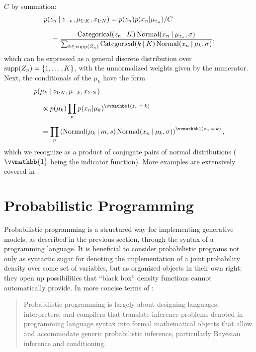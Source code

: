 \(C\) by summation:
\begin{equation}
  \setlength{\jot}{0.8\baselineskip}
  \begin{aligned}
    &p(z_{n} \given z_{-n}, \mu_{1:K}, x_{1:N}) = p(z_{n}) p(x_{n} | \mu_{z_{n}}) / C  \\
    &\quad = \dfrac{\distr{Categorical}(z_{n} \given K) \, \Normal(x_{n} \given \mu_{z_{n}}, \sigma)}{
      \sum_{k \in\, \supp(Z_{n})} \distr{Categorical}(k \given K)\, \Normal(x_{n} \given \mu_{k},
      \sigma)}, \\
  \end{aligned}
\end{equation}
which can be expressed as a general discrete distribution over \(\operatorname{supp}(Z_{n}) = \{1, \ldots, K\}\),
with the unnormalized weights given by the numerator.  Next, the conditionals of the \(\mu_{k}\)
have the form
\begin{equation}
  \setlength{\jot}{0.8\baselineskip}
  \begin{aligned}
    &p(\mu_{k} \given z_{1:N}, \mu_{-k}, x_{1:N}) \\
    &\quad \propto p(\mu_k) \prod_{n} p(x_{n} | \mu_{k})^{\indicator{z_{n} \, = \, k}} \\
    &\quad = \prod_{n} \left( \Normal(\mu_{k} \given m, s) \,
      \Normal(x_{n} \given \mu_{k}, \sigma) \right)^{\indicator{z_{n} \, = \, k}},
  \end{aligned}
\end{equation}
which we recognize as a product of conjugate pairs of normal distributions (\(\vvmathbb{1}\) being the
indicator function).  More examples are extensively covered in \textcite[chapter
24.2]{murphy2012machine}.

\section{Probabilistic Programming}
\label{sec:prob-prog}

Probabilistic programming is a structured way for implementing generative models, as
described in the previous section, through the syntax of a programming language.  It is beneficial
to consider probabilistic programs not only as syntactic sugar for denoting the implementation of a
joint probability density over some set of variables, but as organized objects in their own right:
they open up possibilities that \enquote{black box} density functions cannot automatically
provide. In more concise terms of \textcite{vandemeent2018introduction}:
\begin{quote}
  Probabilistic programming is largely about designing languages, interpreters, and compilers that
  translate inference problems denoted in programming language syntax into formal mathematical
  objects that allow and accommodate generic probabilistic inference, particularly Bayesian
  inference and conditioning.
\end{quote}

